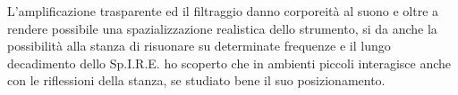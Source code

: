 L'amplificazione trasparente ed il filtraggio danno corporeità al suono e oltre a rendere possibile una spazializzazione realistica dello strumento, si da anche la possibilità alla stanza di risuonare su determinate frequenze e il lungo decadimento dello Sp.I.R.E. ho scoperto che in ambienti piccoli interagisce anche con le riflessioni della stanza, se studiato bene il suo posizionamento.




